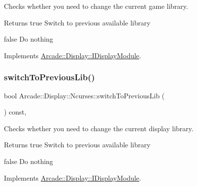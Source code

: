 Checks whether you need to change the current game library. 

\begin{DoxyReturn}{Returns}
true Switch to previous available library 

false Do nothing 
\end{DoxyReturn}


Implements \mbox{\hyperlink{classArcade_1_1Display_1_1IDisplayModule_a3bbbfe00907c8f3e4c7ef1aadedcc513}{Arcade\+::\+Display\+::\+I\+Display\+Module}}.

\mbox{\label{classArcade_1_1Display_1_1Ncurses_ab92672cecd6fad3116de09fa3f315331}} 
\subsubsection{\texorpdfstring{switchToPreviousLib()}{switchToPreviousLib()}}
{\footnotesize\ttfamily bool Arcade\+::\+Display\+::\+Ncurses\+::switch\+To\+Previous\+Lib (\begin{DoxyParamCaption}{ }\end{DoxyParamCaption}) const\hspace{0.3cm}{\ttfamily [final]}, {\ttfamily [virtual]}}



Checks whether you need to change the current display library. 

\begin{DoxyReturn}{Returns}
true Switch to previous available library 

false Do nothing 
\end{DoxyReturn}


Implements \mbox{\hyperlink{classArcade_1_1Display_1_1IDisplayModule_a498d51597164e9f92e97ec2afee426b0}{Arcade\+::\+Display\+::\+I\+Display\+Module}}.

